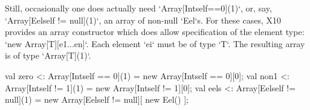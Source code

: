Still, occasionally one does actually need \xcd`Array[Int{self==0}](1)`, 
or, say, \xcd`Array[Eel{self != null}](1)`, an array of non-null \xcd`Eel`s.  
For these cases, X10 provides an array constructor which does allow
specification of the element type: \xcd`new Array[T][e1...en]`.  Each
element \xcd`ei` must be of type \xcd`T`.  The resulting array is of type
\xcd`Array[T](1)`.  
\begin{xten}
val zero <: Array[Int{self == 0}](1) = new Array[Int{self == 0}][0];
val non1 <: Array[Int{self != 1}](1) = new Array[Int{self != 1}][0];
val eels <: Array[Eel{self != null}](1) = 
    new Array[Eel{self != null}][ new Eel() ];
\end{xten}




